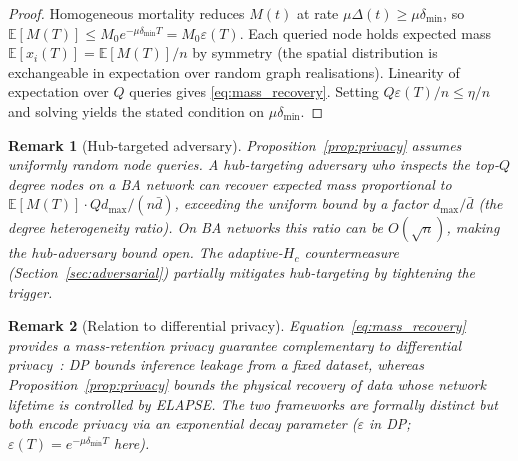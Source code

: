 \documentclass[review,12pt]{elsarticle}
\newcommand{\Hc}{H_c}
\newtheorem{remark}{Remark}
\begin{document}
\begin{proof}
Homogeneous mortality reduces $M(t)$ at rate $\mu\Delta(t) \geq \mu\delta_{\min}$,
so $\mathbb{E}[M(T)] \leq M_0 e^{-\mu\delta_{\min}T} = M_0\varepsilon(T)$.
Each queried node holds expected mass $\mathbb{E}[x_i(T)] = \mathbb{E}[M(T)]/n$
by symmetry (the spatial distribution is exchangeable in expectation over
random graph realisations).  Linearity of expectation over $Q$ queries
gives \eqref{eq:mass_recovery}.  Setting $Q\varepsilon(T)/n \leq \eta/n$
and solving yields the stated condition on $\mu\delta_{\min}$.
\end{proof}

\begin{remark}[Hub-targeted adversary]
\label{rem:privacy_hub}
Proposition~\ref{prop:privacy} assumes uniformly random node queries.
A hub-targeting adversary who inspects the top-$Q$ degree nodes on a
BA network can recover expected mass proportional to
$\mathbb{E}[M(T)] \cdot Q d_{\max} / (n \bar{d})$, exceeding the
uniform bound by a factor $d_{\max}/\bar{d}$ (the degree heterogeneity
ratio).  On BA networks this ratio can be $O(\sqrt{n})$, making the
hub-adversary bound open.  The adaptive-$\Hc$ countermeasure
(Section~\ref{sec:adversarial}) partially mitigates hub-targeting
by tightening the trigger.
\end{remark}

\begin{remark}[Relation to differential privacy]
\label{rem:dp}
Equation~\eqref{eq:mass_recovery} provides a \emph{mass-retention} privacy
guarantee complementary to differential privacy~\cite{dwork2014algorithmic}:
DP bounds inference leakage from a fixed dataset, whereas
Proposition~\ref{prop:privacy} bounds the \emph{physical recovery} of data
whose network lifetime is controlled by ELAPSE.  The two frameworks are
formally distinct but both encode privacy via an exponential decay parameter
($\varepsilon$ in DP; $\varepsilon(T)=e^{-\mu\delta_{\min}T}$ here).
\end{remark}
\end{document}

